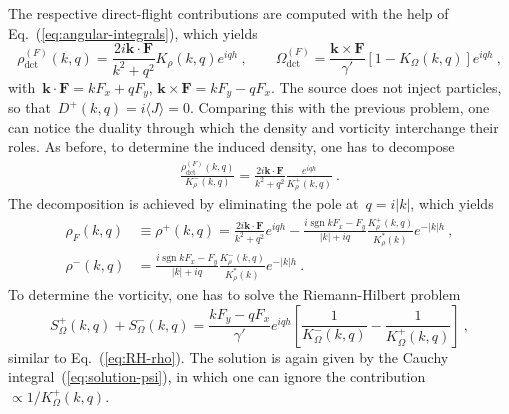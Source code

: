 \documentclass[preprint,aps,eqsecnum, prb]{revtex4-1}
\newcommand{\fplus}[1]{{#1}^{+}}
\newcommand{\fminus}[1]{{#1}^{-}}
\newcommand{\sgn}{\mathop{\mathrm{sgn}}\nolimits}
\newcommand{\dct}[1]{{#1}_\mathrm{dct}}
\begin{document}
The respective direct-flight contributions
are computed with the help of Eq.~(\ref{eq:angular-integrals}), which
yields
\begin{equation}
  \label{eq:source-force-rho}
  \dct{\rho}^{(F)}(k, q)
      =  \frac{2i {\bm k} \cdot {\bm F}}{k^2 + q^2}
               K_\rho(k, q)  e^{i q h}\ , \qquad
  \dct{\Omega}^{(F)} = \frac{{\bm k}\times{\bm F}}{\gamma'}
                                    \left[1 - K_\Omega(k, q)\right] e^{i q h}
  \ , 
\end{equation}
with~${\bm k}\cdot{\bm F} = k F_x + q F_y$,
${\bm k}\times{\bm F} = k F_y - q F_x$. The source does not inject particles,
so that~$\fplus{D}(k, q) = i \langle J \rangle =  0$.
%
Comparing this with the previous problem,
one can notice the duality through which
the density and vorticity interchange their roles.
As  before, to determine the induced density, one has to decompose
\begin{align}
  \frac{\dct{\rho}^(F)(k, q)}{\fminus{K}_\rho(k, q)} =
  \frac{2i {\bm k} \cdot {\bm F}}{k^2 + q^2}
  \frac{e^{i qh}}{\fplus{K}_\rho(k, q)}\ . 
\end{align}
The decomposition is achieved by eliminating the pole at~$q = i |k|$,
which yields 
\begin{align}
  \label{eq:rho-F}
  \rho_F(k, q) &\equiv \fplus{\rho}(k, q)
  = \frac{2i {\bm k} \cdot{\bm F}}{k^2 + q^2}
  e^{iqh} - \frac{i\sgn k F_x - F_y}{|k| + i q}
   \frac{\fplus{K}_\rho(k, q)}{K_\rho^\ast(k)} e^{-|k|h}
  \ ,
  \\
  \fminus{\rho}(k, q) &= \frac{i\sgn k F_x - F_y}{|k| + iq}
   \frac{\fminus{K}_\rho(k, q)}{K_\rho^\ast(k)} e^{-|k|h}
  \ .
\end{align}
To determine the vorticity, one has to solve the Riemann-Hilbert
problem
\begin{equation}
  \fplus{S}_\Omega(k, q) + \fminus{S}_\Omega(k, q) =
  \frac{k F_y - qF_x}{\gamma'} e^{iqh} \left[\frac{1}{\fminus{K}_\Omega(k, q)}
   - \frac{1}{\fplus{K}_\Omega(k, q)} \right]
  \ , 
\end{equation}
similar to Eq.~(\ref{eq:RH-rho}). The solution is again given
by the Cauchy integral~(\ref{eq:solution-psi}), in which
one can ignore the contribution~$\propto 1/\fplus{K}_\Omega(k, q)$.
\end{document}
